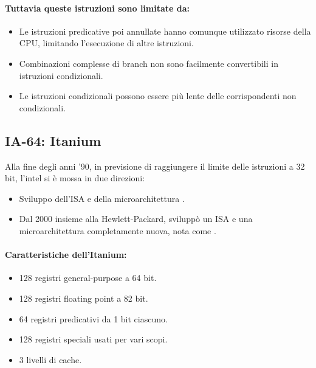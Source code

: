 \paragraph{Tuttavia queste istruzioni sono limitate da:}

\begin{itemize}
  \item Le istruzioni predicative poi annullate hanno comunque utilizzato
risorse della CPU, limitando l’esecuzione di altre istruzioni.
\item Combinazioni complesse di branch non sono facilmente
convertibili in istruzioni condizionali. 
\item Le istruzioni condizionali possono essere più lente delle
corrispondenti non condizionali.
\end{itemize}


\subsection{IA-64: Itanium}

Alla fine degli anni '90, in previsione di raggiungere il limite delle istruzioni a 32 bit, l'intel si è mossa in due direzioni: 

\begin{itemize}
  \item Sviluppo dell'ISA e della microarchitettura . 
  \item Dal 2000 insieme alla Hewlett-Packard, sviluppò un ISA e una microarchitettura completamente nuova, nota come .
\end{itemize}


\paragraph{Caratteristiche dell'Itanium:}

\begin{itemize}
  \item 128 registri general-purpose a 64 bit.
  \item 128 registri floating point a 82 bit.
  \item 64 registri predicativi da 1 bit ciascuno. 
  \item 128 registri speciali usati per vari scopi.
  \item 3 livelli di cache. 
\end{itemize}

